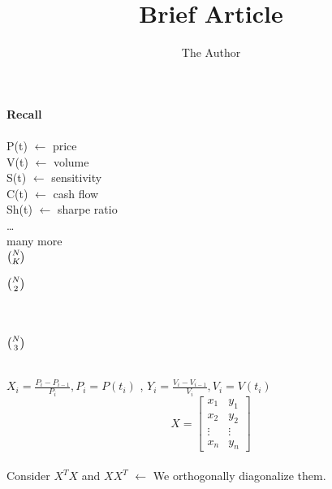 \documentclass[11pt, oneside]{article}   	%
\title{Brief Article}
\author{The Author}
\begin{document}
\maketitle

 \textbf{\Large Recall}\\
 \\
     P(t)   $\leftarrow$ price\\
     V(t)   $\leftarrow$ volume\\
     S(t)   $\leftarrow$ sensitivity\\
     C(t)   $\leftarrow$ cash flow\\
     Sh(t) $\leftarrow$ sharpe ratio\\
     \ldots\\
     many more\\
  ${\Large N\choose K}$\\   
\begin{figure}[htbp]

\end{figure}

${\Large N\choose 2}$\\
\\
\begin{figure}[htbp]

\end{figure}
\\
${\Large N\choose 3}$\\\\
\begin{Large}
$X_i=\frac{P_i -P_{i-1}}{P_i} ,  P_i=P(t_i)$ ,
$Y_i=\frac{V_i -V_{i-1}}{V_i},  V_i=V(t_i)$ \\

\[
   X=
  \left[ {\begin{array}{cc}
   x_1 & y_1 \\
   x_2&  y_2 \\
   \vdots &\vdots\\
   x_n & y_n
  \end{array} } \right]
\]\\
Consider  $X^TX$ and  $XX^T$ $\leftarrow$  We orthogonally diagonalize them.
 
\end{Large}
\end{document}
